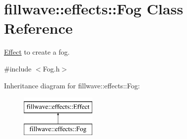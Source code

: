 \hypertarget{classfillwave_1_1effects_1_1Fog}{}\section{fillwave\+:\+:effects\+:\+:Fog Class Reference}
\label{classfillwave_1_1effects_1_1Fog}


\hyperlink{classfillwave_1_1effects_1_1Effect}{Effect} to create a fog.  




{\ttfamily \#include $<$Fog.\+h$>$}

Inheritance diagram for fillwave\+:\+:effects\+:\+:Fog\+:\begin{figure}[H]
\begin{center}
\leavevmode
\includegraphics[height=2.000000cm]{classfillwave_1_1effects_1_1Fog}
\end{center}
\end{figure}
